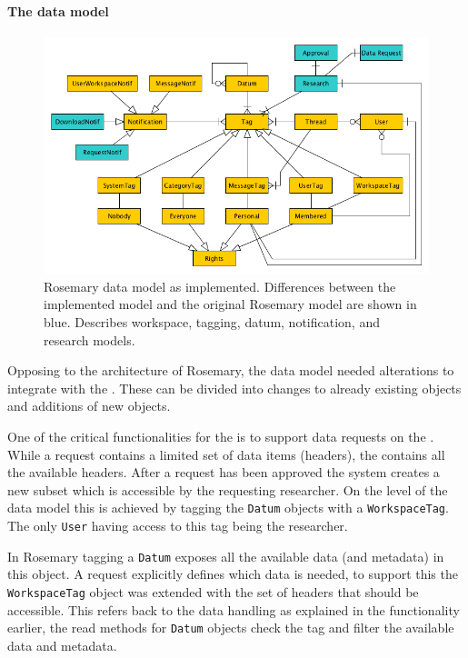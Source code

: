 \paragraph{The data model}
\begin{figure}[!b]
	\centering
	\includegraphics[width=1.0\linewidth]{images/datamodel-adapted}
	\caption{
		Rosemary data model as implemented. 
		Differences between the implemented \ivfsystem{} model and the original Rosemary model are shown in blue.
		Describes workspace, tagging, datum, notification, and research models.
	}
	\label{fig:implementation-rosemary-dm}
\end{figure}

Opposing to the architecture of Rosemary, the data model needed alterations to integrate with the \ivfsystem{}.
These can be divided into changes to already existing objects and additions of new objects.

One of the critical functionalities for the \ivfsystem{} is to support data requests on the \projectdata{}.
While a request contains a limited set of data items (headers), the \projectdata{} contains all the available headers.
After a request has been approved the system creates a new subset which is accessible by the requesting researcher.
On the level of the data model this is achieved by tagging the {\tt Datum} objects with a {\tt WorkspaceTag}.
The only {\tt User} having access to this tag being the researcher.

In Rosemary tagging a {\tt Datum} exposes all the available data (and metadata) in this object.
A request explicitly defines which data is needed, to support this the {\tt WorkspaceTag} object was extended with the set of headers that should be accessible.
This refers back to the data handling as explained in the functionality earlier, the read methods for {\tt Datum} objects check the tag and filter the available data and metadata.

